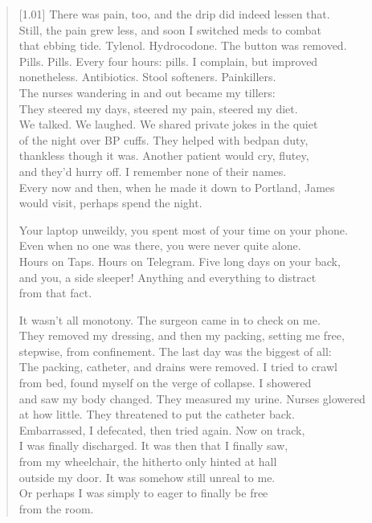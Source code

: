 \begin{verse}[1.01\textwidth]
  There was pain, too, and the drip did indeed lessen that.\\
  Still, the pain grew less, and soon I switched meds to combat\\
  that ebbing tide. Tylenol. Hydrocodone. The button was removed.\\
  Pills. Pills. Every four hours: pills. I complain, but improved\\
  nonetheless. Antibiotics. Stool softeners. Painkillers.\\
  The nurses wandering in and out became my tillers:\\
  They steered my days, steered my pain, steered my diet.\\
  We talked. We laughed. We shared private jokes in the quiet\\
  of the night over BP cuffs. They helped with bedpan duty,\\
  thankless though it was. Another patient would cry, flutey,\\
  and they'd hurry off. I remember none of their names.\\
  Every now and then, when he made it down to Portland, James\\
  would visit, perhaps spend the night.

  \begin{ally}
    \noindent Your laptop unweildy, you spent most of your time on your phone.\\
  \noindent Even when no one was there, you were never quite alone.\\
  \noindent Hours on Taps. Hours on Telegram. Five long days on your back,\\
  \noindent and you, a side sleeper! Anything and everything to distract\\
  \noindent from that fact.
\end{ally}

  It wasn't all monotony. The surgeon came in to check on me.\\
  They removed my dressing, and then my packing, setting me free,\\
  stepwise, from confinement. The last day was the biggest of all:\\
  The packing, catheter, and drains were removed. I tried to crawl\\
  from bed, found myself on the verge of collapse. I showered\\
  and saw my body changed. They measured my urine. Nurses glowered\\
  at how little. They threatened to put the catheter back.\\
  Embarrassed, I defecated, then tried again. Now on track,\\
  I was finally discharged. It was then that I finally saw,\\
  from my wheelchair, the hitherto only hinted at hall\\
  outside my door. It was somehow still unreal to me.\\
  Or perhaps I was simply to eager to finally be free\\
  from the room.


\end{verse}
